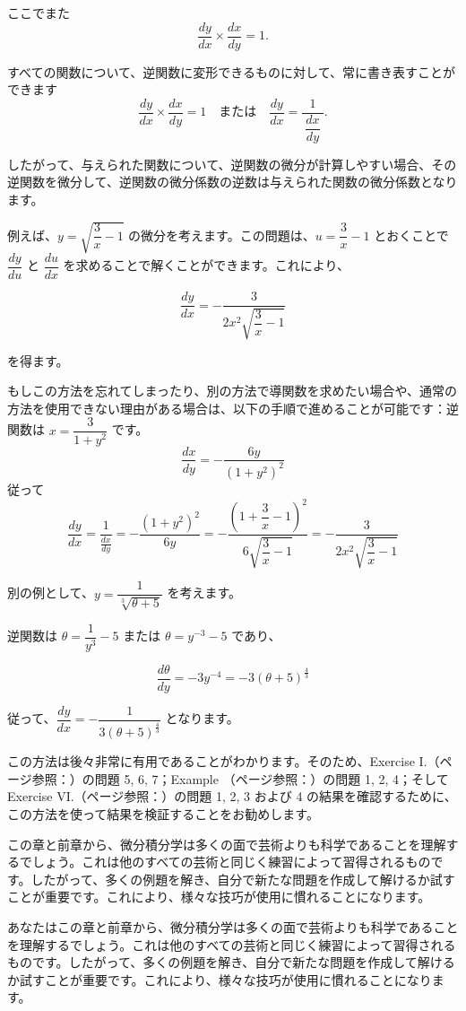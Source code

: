 \documentclass[a4paper,11pt,openany]{ltjsbook}
\begin{document}
\begin{enumerate}
ここでまた
\[
\dfrac{dy}{dx}\times \dfrac{dx}{dy} = 1.
\]

すべての関数について、逆関数に変形できるものに対して、常に書き表すことができます
\[
\dfrac{dy}{dx} \times  \dfrac{dx}{dy} = 1\quad \text{または}\quad
\dfrac{dy}{dx} = \dfrac{1}{\ \dfrac{dx}{dy}\ }.
\]

したがって、与えられた関数について、逆関数の微分が計算しやすい場合、その逆関数を微分して、逆関数の微分係数の逆数は与えられた関数の微分係数となります。

例えば、$y=\sqrt{\dfrac{3}{x}-1}$ の微分を考えます。この問題は、$u=\dfrac{3}{x}-1$ とおくことで $\dfrac{dy}{du}$ と $\dfrac{du}{dx}$ を求めることで解くことができます。これにより、

\[
\frac{dy}{dx} = -\frac{3}{2x^2\sqrt{\dfrac{3}{x}-1}}
\]

を得ます。

もしこの方法を忘れてしまったり、別の方法で導関数を求めたい場合や、通常の方法を使用できない理由がある場合は、以下の手順で進めることが可能です：逆関数は $x=\dfrac{3}{1+y^2}$ です。
\[
\frac{dx}{dy} = -\frac{6y}{(1+y^2)^2}
\]
従って
\[
\frac{dy}{dx} = \frac{1}{\frac{dx}{dy}} = -\frac{(1+y^2)^2}{6y} = -\frac{\left(1+\dfrac{3}{x}-1\right)^2}{6\sqrt{\dfrac{3}{x}-1}} = -\frac{3}{2x^2\sqrt{\dfrac{3}{x}-1}}
\]

別の例として、$y=\dfrac{1}{\sqrt[3]{\theta+5}}$ を考えます。

逆関数は $\theta=\dfrac{1}{y^3}-5$ または $\theta=y^{-3}-5$ であり、

\[
\frac{d\theta}{dy} = -3y^{-4} = -3(\theta + 5)^{\frac{4}{3}}
\]

従って、$\dfrac{dy}{dx} = -\dfrac{1}{3(\theta+5)^{\frac{4}{3}}}$ となります。

この方法は後々非常に有用であることがわかります。そのため、Exercise I.（ページ参照：\pageref{Ex:I}）の問題 5, 6, 7；Example （ページ参照：\pageref{ExNo1}）の問題 1, 2, 4；そして Exercise VI.（ページ参照：\pageref{Ex:VI}）の問題 1, 2, 3 および 4 の結果を確認するために、この方法を使って結果を検証することをお勧めします。

この章と前章から、微分積分学は多くの面で芸術よりも科学であることを理解するでしょう。これは他のすべての芸術と同じく練習によって習得されるものです。したがって、多くの例題を解き、自分で新たな問題を作成して解けるか試すことが重要です。これにより、様々な技巧が使用に慣れることになります。

あなたはこの章と前章から、微分積分学は多くの面で芸術よりも科学であることを理解するでしょう。これは他のすべての芸術と同じく練習によって習得されるものです。したがって、多くの例題を解き、自分で新たな問題を作成して解けるか試すことが重要です。これにより、様々な技巧が使用に慣れることになります。
\end{enumerate}
\end{document}
